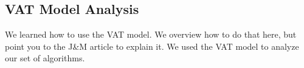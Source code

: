 \subsection{VAT Model Analysis}

  We learned how to use the VAT model.
  We overview how to do that here, but point you to the J\&M article to explain it.
  We used the VAT model to analyze our set of algorithms.

